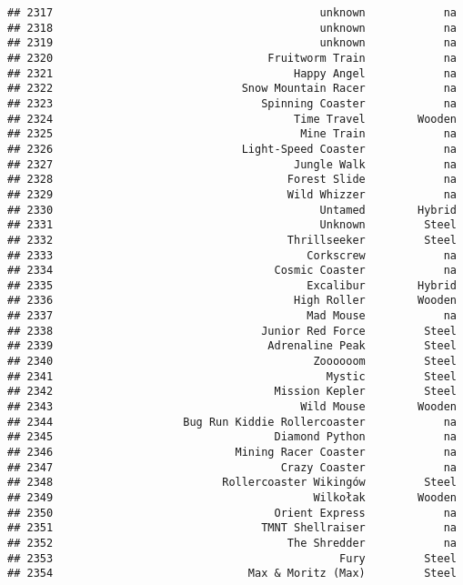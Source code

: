 \documentclass[
]{article}
\begin{document}
\begin{verbatim}
## 2317                                         unknown            na
## 2318                                         unknown            na
## 2319                                         unknown            na
## 2320                                 Fruitworm Train            na
## 2321                                     Happy Angel            na
## 2322                             Snow Mountain Racer            na
## 2323                                Spinning Coaster            na
## 2324                                     Time Travel        Wooden
## 2325                                      Mine Train            na
## 2326                             Light-Speed Coaster            na
## 2327                                     Jungle Walk            na
## 2328                                    Forest Slide            na
## 2329                                    Wild Whizzer            na
## 2330                                         Untamed        Hybrid
## 2331                                         Unknown         Steel
## 2332                                    Thrillseeker         Steel
## 2333                                       Corkscrew            na
## 2334                                  Cosmic Coaster            na
## 2335                                       Excalibur        Hybrid
## 2336                                     High Roller        Wooden
## 2337                                       Mad Mouse            na
## 2338                                Junior Red Force         Steel
## 2339                                 Adrenaline Peak         Steel
## 2340                                        Zoooooom         Steel
## 2341                                          Mystic         Steel
## 2342                                  Mission Kepler         Steel
## 2343                                      Wild Mouse        Wooden
## 2344                    Bug Run Kiddie Rollercoaster            na
## 2345                                  Diamond Python            na
## 2346                            Mining Racer Coaster            na
## 2347                                   Crazy Coaster            na
## 2348                          Rollercoaster Wikingów         Steel
## 2349                                        Wilkołak        Wooden
## 2350                                  Orient Express            na
## 2351                                TMNT Shellraiser            na
## 2352                                    The Shredder            na
## 2353                                            Fury         Steel
## 2354                              Max & Moritz (Max)         Steel

\end{verbatim}
\end{document}
